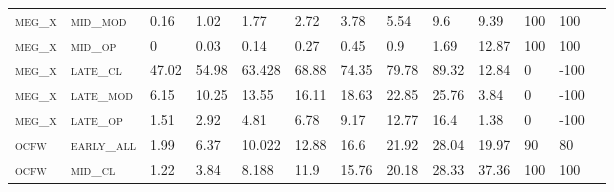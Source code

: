 \begin{landscape}
\begin{table}[!htbp]
\begin{tabular}{@{}lllllllllllll@{}}
\footnotesize \textsc{meg\_x}      & \footnotesize \textsc{mid\_mod  }                & \footnotesize 0.16          & \footnotesize 1.02           & \footnotesize 1.77             & \footnotesize 2.72            & \footnotesize 3.78            & \footnotesize 5.54            & \footnotesize 9.6        & \footnotesize 9.39     & \footnotesize 100    & \footnotesize 100    \\
\footnotesize \textsc{meg\_x}      & \footnotesize \textsc{mid\_op   }                & \footnotesize 0             & \footnotesize 0.03           & \footnotesize 0.14             & \footnotesize 0.27            & \footnotesize 0.45            & \footnotesize 0.9             & \footnotesize 1.69       & \footnotesize 12.87    & \footnotesize 100    & \footnotesize 100    \\
\footnotesize \textsc{meg\_x}      & \footnotesize \textsc{late\_cl  }                & \footnotesize 47.02         & \footnotesize 54.98          & \footnotesize 63.428           & \footnotesize 68.88           & \footnotesize 74.35           & \footnotesize 79.78           & \footnotesize 89.32      & \footnotesize 12.84    & \footnotesize 0      & \footnotesize -100    \\
\footnotesize \textsc{meg\_x}      & \footnotesize \textsc{late\_mod }                & \footnotesize 6.15          & \footnotesize 10.25          & \footnotesize 13.55            & \footnotesize 16.11           & \footnotesize 18.63           & \footnotesize 22.85           & \footnotesize 25.76      & \footnotesize 3.84     & \footnotesize 0      & \footnotesize -100    \\
\footnotesize \textsc{meg\_x}      & \footnotesize \textsc{late\_op  }                & \footnotesize 1.51          & \footnotesize 2.92           & \footnotesize 4.81             & \footnotesize 6.78            & \footnotesize 9.17            & \footnotesize 12.77           & \footnotesize 16.4       & \footnotesize 1.38     & \footnotesize 0      & \footnotesize -100    \\
\footnotesize \textsc{ocfw}        & \footnotesize \textsc{early\_all}                & \footnotesize 1.99          & \footnotesize 6.37           & \footnotesize 10.022           & \footnotesize 12.88           & \footnotesize 16.6            & \footnotesize 21.92           & \footnotesize 28.04      & \footnotesize 19.97    & \footnotesize 90     & \footnotesize 80    \\
\footnotesize \textsc{ocfw}        & \footnotesize \textsc{mid\_cl   }                & \footnotesize 1.22          & \footnotesize 3.84           & \footnotesize 8.188            & \footnotesize 11.9            & \footnotesize 15.76           & \footnotesize 20.18           & \footnotesize 28.33      & \footnotesize 37.36    & \footnotesize 100    & \footnotesize 100    \\

\end{tabular}
\end{table}
\end{landscape}

